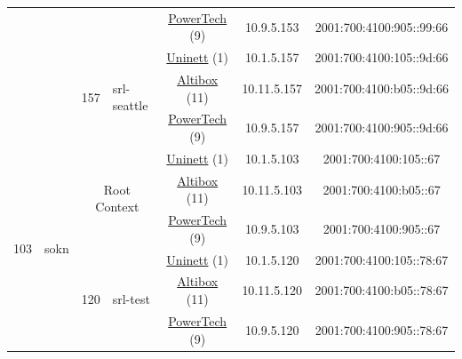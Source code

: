 \begin{small}
\begin{center}
\begin{longtable}{|c|c|c|c|c|c|c|c|}
  &  &  &  & \multicolumn{2}{|c|}{\tiny{\href{http://www.powertech.no}{PowerTech} (9)}} & \tiny{10.9.5.153} & \tiny{2001:700:4100:905::99:66} \\* \cline{3-3}\cline{4-4}\cline{5-5}\cline{6-6}\cline{7-7}\cline{8-8}
  &  & \multirow{3}{*}{\tiny{157}} & \multicolumn{1}{|l|}{\multirow{3}{*}{\tiny{srl-seattle}}} & \multicolumn{2}{|c|}{\tiny{\href{https://www.uninett.no}{Uninett} (1)}} & \tiny{10.1.5.157} & \tiny{2001:700:4100:105::9d:66} \\* \cline{5-5}\cline{6-6}\cline{7-7}\cline{8-8}
  &  &  &  & \multicolumn{2}{|c|}{\tiny{\href{https://www.altibox.no}{Altibox} (11)}} & \tiny{10.11.5.157} & \tiny{2001:700:4100:b05::9d:66} \\* \cline{5-5}\cline{6-6}\cline{7-7}\cline{8-8}
  &  &  &  & \multicolumn{2}{|c|}{\tiny{\href{http://www.powertech.no}{PowerTech} (9)}} & \tiny{10.9.5.157} & \tiny{2001:700:4100:905::9d:66} \\ \hline
 \multirow{30}{*}{\tiny{103}} & \multicolumn{1}{|l|}{\multirow{30}{*}{\tiny{sokn}}} & \multicolumn{2}{|c|}{\multirow{3}{*}{\tiny{Root Context}}} & \multicolumn{2}{|c|}{\tiny{\href{https://www.uninett.no}{Uninett} (1)}} & \tiny{10.1.5.103} & \tiny{2001:700:4100:105::67} \\* \cline{5-5}\cline{6-6}\cline{7-7}\cline{8-8}
  &  & \multicolumn{2}{|c|}{} & \multicolumn{2}{|c|}{\tiny{\href{https://www.altibox.no}{Altibox} (11)}} & \tiny{10.11.5.103} & \tiny{2001:700:4100:b05::67} \\* \cline{5-5}\cline{6-6}\cline{7-7}\cline{8-8}
  &  & \multicolumn{2}{|c|}{} & \multicolumn{2}{|c|}{\tiny{\href{http://www.powertech.no}{PowerTech} (9)}} & \tiny{10.9.5.103} & \tiny{2001:700:4100:905::67} \\* \cline{3-3}\cline{4-4}\cline{5-5}\cline{6-6}\cline{7-7}\cline{8-8}
  &  & \multirow{3}{*}{\tiny{120}} & \multicolumn{1}{|l|}{\multirow{3}{*}{\tiny{srl-test}}} & \multicolumn{2}{|c|}{\tiny{\href{https://www.uninett.no}{Uninett} (1)}} & \tiny{10.1.5.120} & \tiny{2001:700:4100:105::78:67} \\* \cline{5-5}\cline{6-6}\cline{7-7}\cline{8-8}
  &  &  &  & \multicolumn{2}{|c|}{\tiny{\href{https://www.altibox.no}{Altibox} (11)}} & \tiny{10.11.5.120} & \tiny{2001:700:4100:b05::78:67} \\* \cline{5-5}\cline{6-6}\cline{7-7}\cline{8-8}
  &  &  &  & \multicolumn{2}{|c|}{\tiny{\href{http://www.powertech.no}{PowerTech} (9)}} & \tiny{10.9.5.120} & \tiny{2001:700:4100:905::78:67} \\* \cline{3-3}\cline{4-4}\cline{5-5}\cline{6-6}\cline{7-7}\cline{8-8}

\end{longtable}
\end{center}
\end{small}
